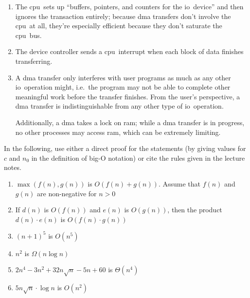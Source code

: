 \documentclass[gantt]{brandeis-problemset}
\newcommand{\io}{\ac{io}}
\newcommand{\cpu}{\ac{cpu}}
\begin{document}
\begin{enumerate}
	\item The \cpu\ sets up ``buffers, pointers, and counters for the
		\io\ device'' and then ignores the transaction entirely;
		because \ac{dma} transfers don't involve the \cpu\ at all,
		they're especially efficient because they don't saturate the
		\cpu\ bus.
	\item The device controller sends a \cpu\ interrupt when each block of
		data finishes transferring.
	\item A \ac{dma} transfer only interferes with user programs as much
		as any other \io\ operation might, i.e.\ the program may not
		be able to complete other meaningful work before the
		transfer finishes. From the user's perspective, a \ac{dma}
		transfer is indistinguishable from any other type of \io\
		operation.

		Additionally, a \ac{dma} takes a lock on \ac{ram}; while a
		\ac{dma} transfer is in progress, no other processes may
		access \ac{ram}, which can be extremely limiting.
\end{enumerate}

\begin{problem}
	In the following, use either a direct proof for the statements (by
	giving values for $c$ and $n_0$ in the definition of big-O notation)
	or cite the rules given in the lecture notes.

	\begin{enumerate}
		\item $\max(f(n), g(n))$ is $O(f(n) + g(n))$. Assume that $f(n)$
			and $g(n)$ are non-negative for $n > 0$
		\item  If $d(n)$ is $O(f(n))$ and $e(n)$ is $O(g(n))$, then
			the product $d(n) \cdot e(n)$ is $O(f(n) \cdot g(n))$
		\item $(n + 1)^5$ is $O(n^5)$
		\item $n^2$ is $\Omega(n\log n)$
		\item $2n^4 - 3n^2 + 32n\sqrt n - 5n + 60$ is $\Theta(n^4)$
		\item $5n\sqrt n \cdot \log n$ is $O(n^2)$
	\end{enumerate}
\end{problem}
\end{document}
